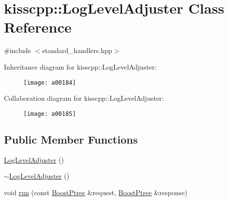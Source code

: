 \hypertarget{a00030}{\section{kisscpp\-:\-:Log\-Level\-Adjuster Class Reference}
\label{a00030}
}


{\ttfamily \#include $<$standard\-\_\-handlers.\-hpp$>$}



Inheritance diagram for kisscpp\-:\-:Log\-Level\-Adjuster\-:\nopagebreak
\begin{figure}[H]
\begin{center}
\leavevmode
\texttt{[image: a00184]}
\end{center}
\end{figure}


Collaboration diagram for kisscpp\-:\-:Log\-Level\-Adjuster\-:\nopagebreak
\begin{figure}[H]
\begin{center}
\leavevmode
\texttt{[image: a00185]}
\end{center}
\end{figure}
\subsection*{Public Member Functions}
\begin{DoxyCompactItemize}
\item 
\hyperlink{a00030_a59d882a82f2f8ab581278b053066ec99}{Log\-Level\-Adjuster} ()
\item 
\hyperlink{a00030_a631d7d4e29b6069219e92a7835189bb5}{$\sim$\-Log\-Level\-Adjuster} ()
\item 
void \hyperlink{a00030_a971d59364d21bbaa283ea520caefa604}{run} (const \hyperlink{a00048_ab36820650b8e0db36402aea80485633c}{Boost\-Ptree} \&request, \hyperlink{a00048_ab36820650b8e0db36402aea80485633c}{Boost\-Ptree} \&response)
\end{DoxyCompactItemize}


